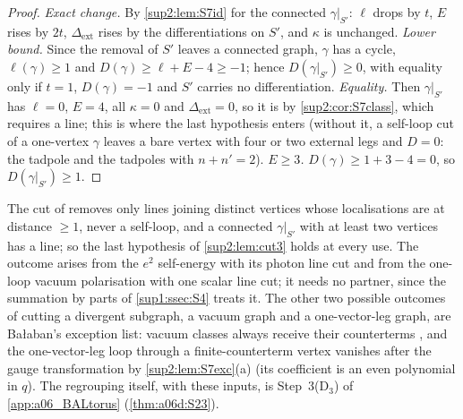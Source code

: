 \begin{proof}
\emph{Exact change.} By \cref{sup2:lem:S7id} for the connected $\gamma|_{S'}$: $\ell$ drops by $t$, $E$ rises by $2t$, $\Delta_{\mathrm{ext}}$ rises by the differentiations on $S'$, and $\kappa$ is unchanged. \emph{Lower bound.} Since the removal of $S'$ leaves a connected graph, $\gamma$ has a cycle, $\ell(\gamma)\ge1$ and $D(\gamma)\ge\ell+E-4\ge-1$; hence $D(\gamma|_{S'})\ge0$, with equality only if $t=1$, $D(\gamma)=-1$ and $S'$ carries no differentiation. \emph{Equality.} Then $\gamma|_{S'}$ has $\ell=0$, $E=4$, all $\kappa=0$ and $\Delta_{\mathrm{ext}}=0$, so it is \cite[(2.4)]{Ba3} by \cref{sup2:cor:S7class}, which requires a line; this is where the last hypothesis enters (without it, a self-loop cut of a one-vertex $\gamma$ leaves a bare vertex with four or two external legs and $D=0$: the \cite[(1.6)]{Ba3} tadpole and the \cite[(1.10)]{Ba3} tadpoles with $n+n'=2$). \emph{$E\ge3$.} $D(\gamma)\ge1+3-4=0$, so $D(\gamma|_{S'})\ge1$.
\end{proof}

The cut of \cite[p.~432]{Ba3} removes only lines joining distinct vertices whose localisations are at distance $\ge1$, never a self-loop, and a connected $\gamma|_{S'}$ with at least two vertices has a line; so the last hypothesis of \cref{sup2:lem:cut3} holds at every use. The outcome \cite[(2.4)]{Ba3} arises from the $e^2$ self-energy with its photon line cut and from the one-loop vacuum polarisation with one scalar line cut; it needs no partner, since the summation by parts of \cref{sup1:ssec:S4} treats it. The other two possible outcomes of cutting a divergent subgraph, a vacuum graph and a one-vector-leg graph, are Ba{\l}aban's exception list: vacuum classes always receive their counterterms \cite[p.~432]{Ba3}, and the one-vector-leg loop through a finite-counterterm vertex vanishes after the gauge transformation by \cref{sup2:lem:S7exc}(a) (its coefficient is an even polynomial in $q$). The regrouping itself, with these inputs, is Step~3(D$_3$) of \cref{app:a06_BALtorus} (\cref{thm:a06d:S23}).
